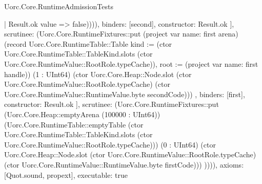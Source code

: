 \begin{lexlean}{Uorc.Core.RuntimeAdmissionTests}
\begin{semanticmodule}
{{{{{                    | Result.ok value => false)))),
                  binders: [second],
                  constructor: Result.ok
                }
              ],
              scrutinee: (Uorc.Core.RuntimeFixtures::put (project var{
                name: first
              } arena) (record Uorc.Core.RuntimeTable::Table {kind := (ctor Uorc.Core.RuntimeTable::TableKind.slots (ctor Uorc.Core.RuntimeValue::RootRole.typeCache)), root := (project var{
                name: first
              } handle)}) (1 : UInt64) (ctor Uorc.Core.Heap::Node.slot (ctor Uorc.Core.RuntimeValue::RootRole.typeCache) (ctor Uorc.Core.RuntimeValue::RuntimeValue.byte secondCode)))
            },
            binders: [first],
            constructor: Result.ok
          }
        ],
        scrutinee: (Uorc.Core.RuntimeFixtures::put (Uorc.Core.Heap::emptyArena (100000 : UInt64)) (Uorc.Core.RuntimeTable::emptyTable (ctor Uorc.Core.RuntimeTable::TableKind.slots (ctor Uorc.Core.RuntimeValue::RootRole.typeCache))) (0 : UInt64) (ctor Uorc.Core.Heap::Node.slot (ctor Uorc.Core.RuntimeValue::RootRole.typeCache) (ctor Uorc.Core.RuntimeValue::RuntimeValue.byte firstCode)))
      })))),
  axioms: [Quot.sound, propext],
  executable: true
}


\end{semanticmodule}
\end{lexlean}
